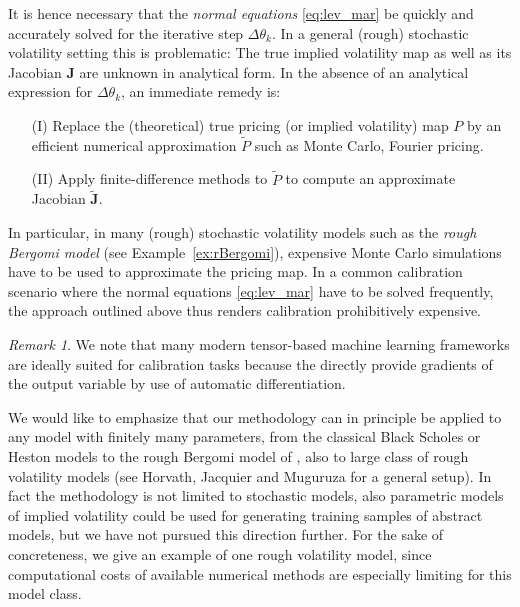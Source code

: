 \documentclass{article}
\theoremstyle{remark}
\newtheorem{remark}{Remark}
\begin{document}
It is hence necessary that the \emph{normal equations} \eqref{eq:lev_mar} be
quickly and accurately solved for the iterative step $\Delta \theta_k$. In a
general (rough) stochastic volatility setting this is problematic: The true
implied volatility map as well as its Jacobian $\bm{J}$ are unknown in
analytical form. In the absence of an analytical expression for
$\Delta \theta_k$, an immediate remedy is:
\begin{itemize}
\item[(I)] Replace the (theoretical) true pricing (or implied volatility) map
  $P$ by an efficient numerical approximation $\tilde{P}$ such as Monte Carlo,
  Fourier pricing. 	
\item[(II)] Apply finite-difference methods to $\tilde{P}$ to compute an
  approximate Jacobian $\tilde{\bm{J}}$. 
\end{itemize}
In particular, in many (rough) stochastic volatility models such as the
\emph{rough Bergomi model} (see Example~\ref{ex:rBergomi}), expensive Monte
Carlo simulations have to be used to approximate the pricing map. In a common
calibration scenario where the normal equations \eqref{eq:lev_mar} have to be
solved frequently, the approach outlined above thus renders calibration
prohibitively expensive.\\

\begin{remark}
  \label{rem:DNN-gradient}
  We note that many modern tensor-based machine learning frameworks are
  ideally suited for calibration tasks because the directly provide gradients
  of the output variable by use of automatic differentiation. 
\end{remark}


We would like to emphasize that our methodology can in principle be applied to
any model with finitely many parameters,
from the classical Black Scholes
or Heston models to the rough Bergomi model of \cite{BFG15}, also to large
class of rough volatility models (see Horvath, Jacquier and Muguruza
\cite{HJM17} for a general setup). In fact the methodology is not limited to
stochastic models, also parametric models of implied volatility could be used
for generating training samples of abstract models, but we have not pursued
this direction further.
For the sake of concreteness, we give an example of one rough volatility model, since
computational costs of available numerical methods are especially limiting for
this model class.
\end{document}
